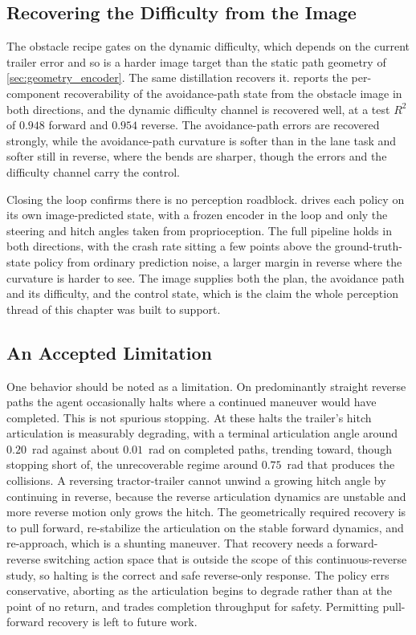 \subsection{Recovering the Difficulty from the Image}

The obstacle recipe gates on the dynamic difficulty, which depends on the current trailer error and so is a harder image target than the static path geometry of \cref{sec:geometry_encoder}. The same distillation recovers it.  reports the per-component recoverability of the avoidance-path state from the obstacle image in both directions, and the dynamic difficulty channel is recovered well, at a test $R^2$ of $0.948$ forward and $0.954$ reverse. The avoidance-path errors are recovered strongly, while the avoidance-path curvature is softer than in the lane task and softer still in reverse, where the bends are sharper, though the errors and the difficulty channel carry the control.



Closing the loop confirms there is no perception roadblock.  drives each policy on its own image-predicted state, with a frozen encoder in the loop and only the steering and hitch angles taken from proprioception. The full pipeline holds in both directions, with the crash rate sitting a few points above the ground-truth-state policy from ordinary prediction noise, a larger margin in reverse where the curvature is harder to see. The image supplies both the plan, the avoidance path and its difficulty, and the control state, which is the claim the whole perception thread of this chapter was built to support.



\subsection{An Accepted Limitation}

One behavior should be noted as a limitation. On predominantly straight reverse paths the agent occasionally halts where a continued maneuver would have completed. This is not spurious stopping. At these halts the trailer's hitch articulation is measurably degrading, with a terminal articulation angle around $0.20$~rad against about $0.01$~rad on completed paths, trending toward, though stopping short of, the unrecoverable regime around $0.75$~rad that produces the collisions. A reversing tractor-trailer cannot unwind a growing hitch angle by continuing in reverse, because the reverse articulation dynamics are unstable and more reverse motion only grows the hitch. The geometrically required recovery is to pull forward, re-stabilize the articulation on the stable forward dynamics, and re-approach, which is a shunting maneuver. That recovery needs a forward-reverse switching action space that is outside the scope of this continuous-reverse study, so halting is the correct and safe reverse-only response. The policy errs conservative, aborting as the articulation begins to degrade rather than at the point of no return, and trades completion throughput for safety. Permitting pull-forward recovery is left to future work.

